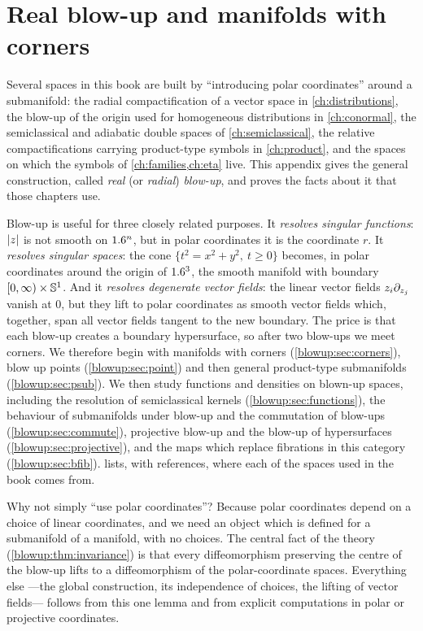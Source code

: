 \chapter{Real blow-up and manifolds with corners}\label{ch:blowup}
\providecommand{\Vb}{\mathcal{V}_{\mathrm{b}}}
\providecommand{\bT}{{}^{\mathrm{b}}T}
\providecommand{\relRC}[2]{{}^{#1}\overline{#2}}
\providecommand{\oRC}[1]{{}^{1}\overline{#1}}

Several spaces in this book are built by ``introducing polar coordinates'' around a
submanifold: the radial compactification of a vector space in \cref{ch:distributions},
the blow-up of the origin used for homogeneous distributions in \cref{ch:conormal}, the
semiclassical and adiabatic double spaces of \cref{ch:semiclassical}, the relative
compactifications carrying product-type symbols in \cref{ch:product}, and the spaces on
which the symbols of \cref{ch:families,ch:eta} live. This appendix gives the general
construction, called \emph{real} (or \emph{radial}) \emph{blow-up}, and proves the facts
about it that those chapters use.

Blow-up is useful for three closely related purposes. It \emph{resolves singular
functions}: $\lvert z\rvert$ is not smooth on $1.6^n$, but in polar coordinates it is the
coordinate $r$. It \emph{resolves singular spaces}: the cone $\{t^2=x^2+y^2,\ t\ge0\}$
becomes, in polar coordinates around the origin of $1.6^3$, the smooth manifold with
boundary $[0,\infty)\times\mathbb{S}^1$. And it \emph{resolves degenerate vector fields}:
the linear vector fields $z_i\partial_{z_j}$ vanish at $0$, but they lift to polar coordinates
as smooth vector fields which, together, span all vector fields tangent to the new
boundary. The price is that each blow-up creates a boundary hypersurface, so after two
blow-ups we meet corners. We therefore begin with manifolds with corners
(\cref{blowup:sec:corners}), blow up points (\cref{blowup:sec:point}) and then general
product-type submanifolds (\cref{blowup:sec:psub}). We then study functions and
densities on blown-up spaces, including the resolution of semiclassical kernels
(\cref{blowup:sec:functions}), the behaviour of submanifolds under blow-up and the
commutation of blow-ups (\cref{blowup:sec:commute}), projective blow-up and the blow-up
of hypersurfaces (\cref{blowup:sec:projective}), and the maps which replace fibrations
in this category (\cref{blowup:sec:bfib}).  lists, with
references, where each of the spaces used in the book comes from.

\begin{discussion}
Why not simply ``use polar coordinates''? Because polar coordinates depend on a choice
of linear coordinates, and we need an object which is defined for a submanifold of a
manifold, with no choices. The central fact of the theory
(\cref{blowup:thm:invariance}) is that every diffeomorphism preserving the centre of
the blow-up lifts to a diffeomorphism of the polar-coordinate spaces. Everything else
---the global construction, its independence of choices, the lifting of vector
fields--- follows from this one lemma and from explicit computations in polar or
projective coordinates.
\end{discussion}

